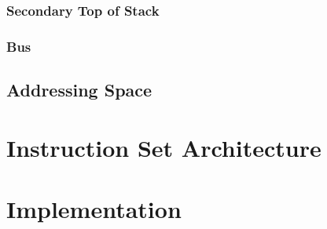 \documentclass[12pt]{report}
\begin{document}
    \subsection{Secondary Top of Stack}
    \subsection{Bus}

    \section{Addressing Space}

    \chapter{Instruction Set Architecture}

    \chapter{Implementation}
\end{document}
